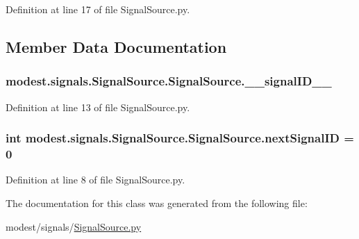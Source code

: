 Definition at line 17 of file Signal\+Source.\+py.



\subsection{Member Data Documentation}
\subsubsection[{\texorpdfstring{\+\_\+\+\_\+signal\+I\+D\+\_\+\+\_\+}{__signalID__}}]{\setlength{\rightskip}{0pt plus 5cm}modest.\+signals.\+Signal\+Source.\+Signal\+Source.\+\_\+\+\_\+signal\+I\+D\+\_\+\+\_\+\hspace{0.3cm}{\ttfamily [private]}}\hypertarget{classmodest_1_1signals_1_1SignalSource_1_1SignalSource_ae94cf1f121ca8b17509b55c0590457e4}{}\label{classmodest_1_1signals_1_1SignalSource_1_1SignalSource_ae94cf1f121ca8b17509b55c0590457e4}


Definition at line 13 of file Signal\+Source.\+py.

\subsubsection[{\texorpdfstring{next\+Signal\+ID}{nextSignalID}}]{\setlength{\rightskip}{0pt plus 5cm}int modest.\+signals.\+Signal\+Source.\+Signal\+Source.\+next\+Signal\+ID = 0\hspace{0.3cm}{\ttfamily [static]}}\hypertarget{classmodest_1_1signals_1_1SignalSource_1_1SignalSource_a7a87b05025246170067fbf9ed3ef49fd}{}\label{classmodest_1_1signals_1_1SignalSource_1_1SignalSource_a7a87b05025246170067fbf9ed3ef49fd}


Definition at line 8 of file Signal\+Source.\+py.



The documentation for this class was generated from the following file\+:\begin{DoxyCompactItemize}
\item 
modest/signals/\hyperlink{SignalSource_8py}{Signal\+Source.\+py}\end{DoxyCompactItemize}
